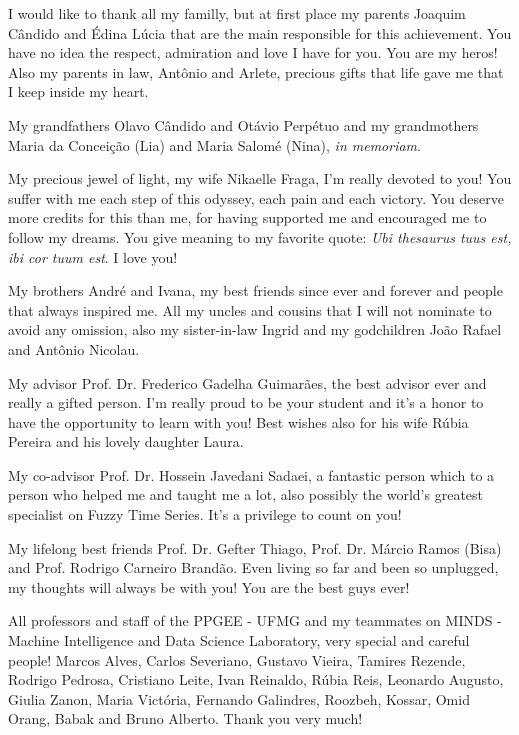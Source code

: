 \begin{agradecimentos}
I would like to thank all my familly, but at first place my parents Joaquim Cândido and Édina Lúcia that are the main responsible for this achievement.  You have no idea the respect, admiration and love I have for you. You are my heros! Also my parents in law, Antônio and Arlete, precious gifts that life gave me that I keep inside my heart. 

My grandfathers Olavo Cândido and Otávio Perpétuo and my grandmothers Maria da Conceição (Lia) and Maria Salomé (Nina), \textit{in memoriam}.

My precious jewel of light, my wife Nikaelle Fraga, I'm really devoted to you! You suffer with me each step of this odyssey, each pain and each victory. You deserve more credits for this than me, for having supported me and encouraged me to follow my dreams. You give meaning to my favorite quote: \textit{Ubi thesaurus tuus est, ibi cor tuum est}. I love you!

My brothers André and Ivana, my best friends since ever and forever and people that always inspired me. All my uncles and cousins that I will not nominate to avoid any omission, also my sister-in-law Ingrid and my godchildren João Rafael and Antônio Nicolau. 

My advisor Prof. Dr. Frederico Gadelha Guimarães, the best advisor ever and really a gifted person. I'm really proud to be your student and it's a honor to have the opportunity to learn with you! Best wishes also for his wife Rúbia Pereira and his lovely daughter Laura.

My co-advisor Prof. Dr. Hossein Javedani Sadaei, a fantastic person which to a person who helped me and taught me a lot, also possibly the world's greatest specialist on Fuzzy Time Series. It's a privilege to count on you!

My lifelong best friends Prof. Dr. Gefter Thiago, Prof. Dr. Márcio Ramos (Bisa) and Prof. Rodrigo Carneiro Brandão. Even living so far and been so unplugged, my thoughts will always be with you! You are the best guys ever! 

All professors and staff of the PPGEE - UFMG and my teammates on MINDS - Machine Intelligence and Data Science Laboratory, very special and careful people! Marcos Alves, Carlos Severiano, Gustavo Vieira, Tamires Rezende, Rodrigo Pedrosa, Cristiano Leite, Ivan Reinaldo, Rúbia Reis, Leonardo Augusto,  Giulia Zanon, Maria Victória, Fernando Galindres, Roozbeh, Kossar, Omid Orang, Babak and Bruno Alberto. Thank you very much!  


\end{agradecimentos}
